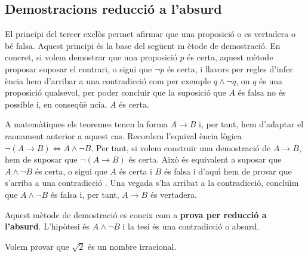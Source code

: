\subsection{Demostracions reducci\'{o} a l'absurd}

El principi del tercer excl\`{o}s permet afirmar que una proposici\'{o} o es
vertadera o b\'{e} falsa. Aquest principi \'{e}s la base del seg\"{u}ent m%
\`{e}tode de demostraci\'{o}. En concret, si volem demostrar que una
proposici\'{o} $p$ \'{e}s certa, aquest m\`{e}tode proposar suposar el
contrari, o sigui que $\lnot p$ \'{e}s certa, i llavors per regles d'infer%
\`{e}ncia hem d'arribar a una contradicci\'{o} com per exemple $q\wedge\lnot
q$, on $q$ \'{e}s una proposici\'{o} qualsevol, per poder concluir que la
suposici\'{o} que $A$ \'{e}s falsa no \'{e}s possible i, en conseq\"{u}\`{e}%
ncia, $A$ \'{e}s certa.

A matem\`{a}tiques els teoremes tenen la forma $A\longrightarrow B$ i, per
tant, hem d'adaptar el raonament anterior a aquest cas. Recordem l'equival%
\`{e}ncia l\`{o}gica $\lnot\left( A\longrightarrow B\right)
\Longleftrightarrow A\wedge\lnot B$. Per tant, si volem construir una
demostraci\'{o} de $A\longrightarrow B$, hem de suposar que $\lnot\left(
A\longrightarrow B\right) $ \'{e}s certa. Aix\`{o} \'{e}s equivalent a
suposar que $A\wedge\lnot B$ \'{e}s certa, o sigui que $A$ \'{e}s certa i $B$
\'{e}s falsa i d'aqu\'{\i} hem de provar que s'arriba a una contradicci\'{o}%
. Una vegada s'ha arribat a la contradicci\'{o}, conclu\"{\i}m que $%
A\wedge\lnot B$ \'{e}s falsa i, per tant, $A\longrightarrow B$ \'{e}s
vertadera.

Aquest m\`{e}tode de demostraci\'{o} es coneix com a \textbf{prova per
reducci\'{o} a l'absurd}. L'hip\`{o}tesi \'{e}s $A\wedge\lnot B$ i la tesi
\'{e}s una contradicci\'{o} o absurd.

\begin{exemple}
Volem provar que $\sqrt{2}$ \'{e}s un nombre irracional.
\end{exemple}

